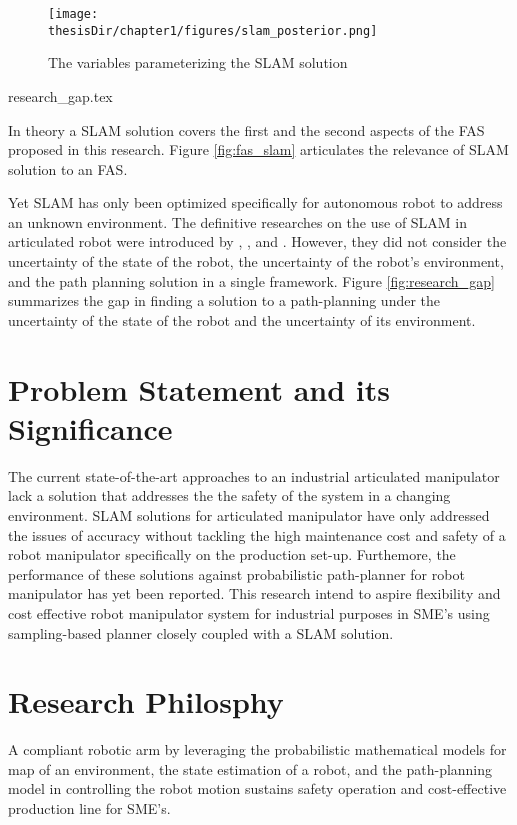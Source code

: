 \begin{figure}
  \centering
  \texttt{[image: \\thesisDir/chapter1/figures/slam\_posterior.png]}
  \caption{The variables parameterizing the SLAM solution }
  \label{fig:slam_posterior}
\end{figure}

{research_gap.tex}


In theory a SLAM solution covers the first and the second aspects of the FAS proposed in this research.
Figure \ref{fig:fas_slam} articulates the relevance of SLAM solution to an FAS.

Yet SLAM has only been optimized specifically for autonomous robot to address an unknown
environment. The definitive researches on the use of SLAM in articulated robot were introduced by 
\textcite{Klingensmith2016}, \textcite{Li2019c}, and \textcite{Ito2020}. However, they
did not consider the uncertainty of the state of the robot, the uncertainty of 
the robot’s environment, and
the path planning solution in a single framework. Figure \ref{fig:research_gap} 
summarizes the gap in finding a solution to a path-planning under the uncertainty of
the state of the robot and the uncertainty of its environment.


\section{Problem Statement and its Significance}\label{sec:problem_statement}
The current state-of-the-art approaches to an industrial articulated manipulator lack a 
solution that addresses the the safety of the system in a changing environment. 
SLAM solutions for articulated manipulator have only addressed 
the issues of accuracy without tackling the high maintenance cost and safety of a robot manipulator specifically 
on the production set-up. 
Furthemore, the performance of these solutions against  probabilistic path-planner for robot manipulator has
yet been reported. 
This research intend to aspire flexibility and cost effective
robot manipulator system for industrial purposes in SME's using
sampling-based planner closely coupled with a SLAM solution.

\section{Research Philosphy}\label{sec:research_philosophy}
A compliant robotic arm by leveraging the probabilistic mathematical models for map
of an environment, the state estimation of a robot, and the path-planning model in controlling the robot motion
sustains safety operation and cost-effective production line for
SME's.


